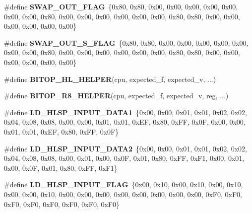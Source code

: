 \begin{DoxyCompactItemize}
\item 
\mbox{\label{unit-test-cpu-dispatch_8c_a2aec0d49f06840fb9b8d017a0a5bbf91}} 
\#define {\bfseries S\+W\+A\+P\+\_\+\+O\+U\+T\+\_\+\+F\+L\+AG}~\{0x80, 0x80, 0x00, 0x00, 0x00, 0x00, 0x00, 0x00, 0x00, 0x80, 0x00, 0x00, 0x00, 0x00, 0x00, 0x00, 0x80, 0x80, 0x00, 0x00, 0x00, 0x00, 0x00, 0x00\}
\item 
\mbox{\label{unit-test-cpu-dispatch_8c_af0d2ed7e2bef0302a41acb1d9afbac47}} 
\#define {\bfseries S\+W\+A\+P\+\_\+\+O\+U\+T\+\_\+\+S\+\_\+\+F\+L\+AG}~\{0x80, 0x80, 0x00, 0x00, 0x00, 0x00, 0x00, 0x00, 0x00, 0x80, 0x00, 0x00, 0x00, 0x00, 0x00, 0x00, 0x80, 0x80, 0x00, 0x00, 0x00, 0x00, 0x00, 0x00\}
\item 
\#define {\bfseries B\+I\+T\+O\+P\+\_\+\+H\+L\+\_\+\+H\+E\+L\+P\+ER}(cpu,  expected\+\_\+f,  expected\+\_\+v, ...)
\item 
\#define {\bfseries B\+I\+T\+O\+P\+\_\+\+R8\+\_\+\+H\+E\+L\+P\+ER}(cpu,  expected\+\_\+f,  expected\+\_\+v,  reg, ...)
\item 
\mbox{\label{unit-test-cpu-dispatch_8c_a0e5ecba49a15075d0322a30b2fc05f22}} 
\#define {\bfseries L\+D\+\_\+\+H\+L\+S\+P\+\_\+\+I\+N\+P\+U\+T\+\_\+\+D\+A\+T\+A1}~\{0x00, 0x00, 0x01, 0x01, 0x02, 0x02, 0x04, 0x08, 0x08, 0x00, 0x00, 0x01, 0x01, 0x\+E\+F, 0x80, 0x\+F\+F, 0x0\+F, 0x00, 0x00, 0x01, 0x01, 0x\+E\+F, 0x80, 0x\+F\+F, 0x0\+F\}
\item 
\mbox{\label{unit-test-cpu-dispatch_8c_aa42ceac63414a6dd2fb8e5c541833f10}} 
\#define {\bfseries L\+D\+\_\+\+H\+L\+S\+P\+\_\+\+I\+N\+P\+U\+T\+\_\+\+D\+A\+T\+A2}~\{0x00, 0x00, 0x01, 0x01, 0x02, 0x02, 0x04, 0x08, 0x08, 0x00, 0x01, 0x00, 0x0\+F, 0x01, 0x80, 0x\+F\+F, 0x\+F1, 0x00, 0x01, 0x00, 0x0\+F, 0x01, 0x80, 0x\+F\+F, 0x\+F1\}
\item 
\mbox{\label{unit-test-cpu-dispatch_8c_a875c5f2502a756a26f5153eb0c7b9e81}} 
\#define {\bfseries L\+D\+\_\+\+H\+L\+S\+P\+\_\+\+I\+N\+P\+U\+T\+\_\+\+F\+L\+AG}~\{0x00, 0x10, 0x00, 0x10, 0x00, 0x10, 0x00, 0x00, 0x10, 0x00, 0x00, 0x00, 0x00, 0x00, 0x00, 0x00, 0x00, 0x\+F0, 0x\+F0, 0x\+F0, 0x\+F0, 0x\+F0, 0x\+F0, 0x\+F0, 0x\+F0\}
\item 
\mbox{\label{unit-test-cpu-dispatch_8c_ae71c130bf94e6ad26b64fb333ed45885}} 

\end{DoxyCompactItemize}
